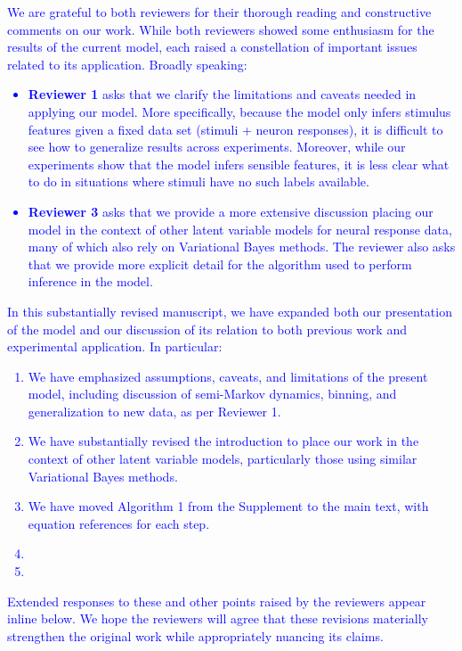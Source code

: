 \documentclass[12pt,a4paper]{article}
\newcommand{\edit}[1]{\textcolor{blue}{#1}}
\begin{document}
\edit{We are grateful to both reviewers for their thorough reading and constructive comments on our work. While both reviewers showed some enthusiasm for the results of the current model, each raised a constellation of important issues related to its application. Broadly speaking:
\begin{itemize}
    \item {\bf Reviewer 1} asks that we clarify the limitations and caveats needed in applying our model. More specifically, because the model only infers stimulus features given a fixed data set (stimuli + neuron responses), it is difficult to see how to generalize results across experiments. Moreover, while our experiments show that the model infers sensible features, it is less clear what to do in situations where stimuli have no such labels available.
    \item {\bf Reviewer 3} asks that we provide a more extensive discussion placing our model in the context of other latent variable models for neural response data, many of which also rely on Variational Bayes methods. The reviewer also asks that we provide more explicit detail for the algorithm used to perform inference in the model.
\end{itemize}
}

\edit{In this substantially revised manuscript, we have expanded both our presentation of the model and our discussion of its relation to both previous work and experimental application. In particular:
\begin{enumerate}
    \item We have emphasized assumptions, caveats, and limitations of the present model, including discussion of semi-Markov dynamics, binning, and generalization to new data, as per Reviewer 1.
    \item We have substantially revised the introduction to place our work in the context of other latent variable models, particularly those using similar Variational Bayes methods.
    \item We have moved Algorithm 1 from the Supplement to the main text, with equation references for each step.
    \item \color{red}{goodness of fit for firing rates?}
    \item \color{red}{binning simulation?}
\end{enumerate}
}

\edit{
Extended responses to these and other points raised by the reviewers appear inline below. We hope the reviewers will agree that these revisions {\color{red}{and new analyses}} materially strengthen the original work while appropriately nuancing its claims.
}
\end{document}

